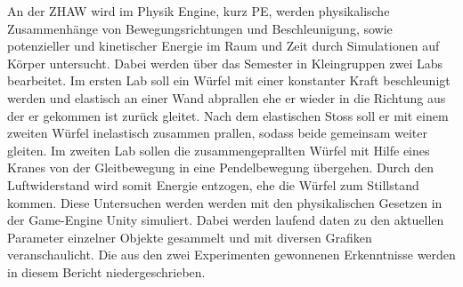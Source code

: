 \documentclass[../main.tex]{subfiles}
\begin{document}
An der ZHAW wird im Physik Engine, kurz PE, werden physikalische Zusammenhänge
von Bewegungsrichtungen und Beschleunigung, sowie potenzieller und kinetischer Energie im Raum und Zeit
durch Simulationen auf Körper untersucht. Dabei werden über das Semester in Kleingruppen
zwei Labs bearbeitet.
\newline
\newline
Im ersten Lab soll ein Würfel mit einer konstanter Kraft beschleunigt werden und elastisch an einer
Wand abprallen ehe er wieder in die Richtung aus der er gekommen ist zurück gleitet. Nach dem elastischen
Stoss soll er mit einem zweiten Würfel inelastisch zusammen prallen, sodass beide gemeinsam weiter gleiten.
\newline
\newline
Im zweiten Lab sollen die zusammengeprallten Würfel mit Hilfe eines Kranes von der Gleitbewegung in eine
Pendelbewegung übergehen. Durch den Luftwiderstand wird somit Energie entzogen, ehe die Würfel zum
Stillstand kommen.
\newline
\newline
Diese Untersuchen werden werden mit den physikalischen Gesetzen in der Game-Engine Unity simuliert.
Dabei werden laufend daten zu den aktuellen Parameter einzelner Objekte gesammelt und mit diversen
Grafiken veranschaulicht. Die aus den zwei Experimenten gewonnenen Erkenntnisse werden in diesem Bericht
niedergeschrieben.
\end{document}
